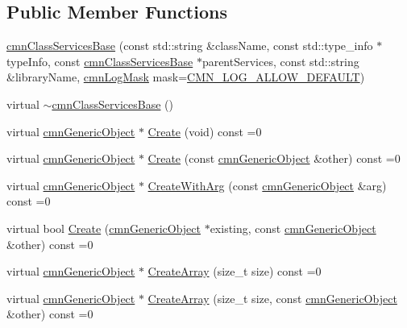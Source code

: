 \subsection*{Public Member Functions}
\begin{DoxyCompactItemize}
\item 
\hyperlink{classcmn_class_services_base_a63070c19576f22c52346f4bf90a0e4ea}{cmn\-Class\-Services\-Base} (const std\-::string \&class\-Name, const std\-::type\-\_\-info $\ast$type\-Info, const \hyperlink{classcmn_class_services_base}{cmn\-Class\-Services\-Base} $\ast$parent\-Services, const std\-::string \&library\-Name, \hyperlink{cmn_log_lo_d_8h_a44b6ef7560b0d204460b0a54f1a5d702}{cmn\-Log\-Mask} mask=\hyperlink{cmn_log_lo_d_8h_a941e5ff3075571f0ad1e53e1204bd856}{C\-M\-N\-\_\-\-L\-O\-G\-\_\-\-A\-L\-L\-O\-W\-\_\-\-D\-E\-F\-A\-U\-L\-T})
\item 
virtual \hyperlink{classcmn_class_services_base_aa4843bb764060136cfc9622d6def7562}{$\sim$cmn\-Class\-Services\-Base} ()
\item 
virtual \hyperlink{classcmn_generic_object}{cmn\-Generic\-Object} $\ast$ \hyperlink{classcmn_class_services_base_a0028698e7a2d3a666bfc34e408888da4}{Create} (void) const =0
\item 
virtual \hyperlink{classcmn_generic_object}{cmn\-Generic\-Object} $\ast$ \hyperlink{classcmn_class_services_base_a737f4ac5b23f6d1fbca401057808a735}{Create} (const \hyperlink{classcmn_generic_object}{cmn\-Generic\-Object} \&other) const =0
\item 
virtual \hyperlink{classcmn_generic_object}{cmn\-Generic\-Object} $\ast$ \hyperlink{classcmn_class_services_base_a8dea3c1fa8d047e557504a7992986dc3}{Create\-With\-Arg} (const \hyperlink{classcmn_generic_object}{cmn\-Generic\-Object} \&arg) const =0
\item 
virtual bool \hyperlink{classcmn_class_services_base_a67950a4c90805ce5404c3e66a3ffeb13}{Create} (\hyperlink{classcmn_generic_object}{cmn\-Generic\-Object} $\ast$existing, const \hyperlink{classcmn_generic_object}{cmn\-Generic\-Object} \&other) const =0
\item 
virtual \hyperlink{classcmn_generic_object}{cmn\-Generic\-Object} $\ast$ \hyperlink{classcmn_class_services_base_a13e2ee9caebfc333b50f0bd3b75f601b}{Create\-Array} (size\-\_\-t size) const =0
\item 
virtual \hyperlink{classcmn_generic_object}{cmn\-Generic\-Object} $\ast$ \hyperlink{classcmn_class_services_base_a585a038a9a33973cd2f6a8a0ec251a7d}{Create\-Array} (size\-\_\-t size, const \hyperlink{classcmn_generic_object}{cmn\-Generic\-Object} \&other) const =0

\end{DoxyCompactItemize}
